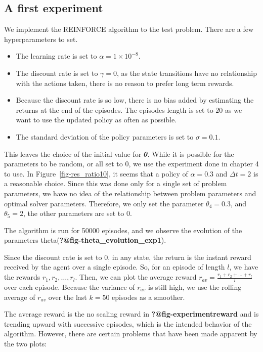 \documentclass[
  letterpaper,
]{report}
\providecommand{\tightlist}{%
  \setlength{\itemsep}{0pt}\setlength{\parskip}{0pt}}\usepackage{longtable,booktabs,array}
\theoremstyle{definition}
\theoremstyle{plain}
\theoremstyle{definition}
\theoremstyle{remark}
\begin{document}
\subsection{A first experiment}\label{a-first-experiment}

We implement the REINFORCE algorithm to the test problem. There are a
few hyperparameters to set.

\begin{itemize}
\tightlist
\item
  The learning rate is set to \(\alpha=1\times10^{-8}\).
\item
  The discount rate is set to \(\gamma = 0\), as the state transitions
  have no relationship with the actions taken, there is no reason to
  prefer long term rewards.
\item
  Because the discount rate is so low, there is no bias added by
  estimating the returns at the end of the episodes. The episodes length
  is set to \(20\) as we want to use the updated policy as often as
  possible.
\item
  The standard deviation of the policy parameters is set to
  \(\sigma = 0.1\).
\end{itemize}

This leaves the choice of the initial value for \(\mathbfit{\theta}\).
While it is possible for the parameters to be random, or all set to 0,
we use the experiment done in chapter 4 to use. In
Figure~\ref{fig-res_ratio10}, it seems that a policy of \(\alpha = 0.3\)
and \(\Delta t = 2\) is a reasonable choice. Since this was done only
for a single set of problem parameters, we have no idea of the
relationship between problem parameters and optimal solver parameters.
Therefore, we only set the parameter \(\theta_4 = 0.3\), and
\(\theta_5=2\), the other parameters are set to 0.

The algorithm is run for 50000 episodes, and we observe the evolution of
the parameters theta(\textbf{?@fig-theta\_evolution\_exp1}).

Since the discount rate is set to \(0\), in any state, the return is the
instant reward received by the agent over a single episode. So, for an
episode of length \(l\), we have the rewards \(r_1, r_2, \dots, r_l\).
Then, we can plot the average reward
\(r_{av} = \frac{r_1 + r_2 +\dots + r_l}{l}\) over each episode. Because
the variance of \(r_{av}\) is still high, we use the rolling average of
\(r_{av}\) over the last \(k = 50\) episodes as a smoother.

The average reward is the no scaling reward in
\textbf{?@fig-experimentreward} and is trending upward with successive
episodes, which is the intended behavior of the algorithm. However,
there are certain problems that have been made apparent by the two
plots:
\end{document}

